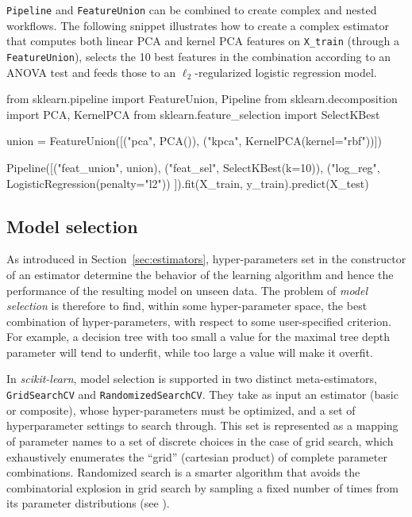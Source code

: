 \documentclass{llncs}
\newcommand{\sklearn}{\textit{scikit-learn}\xspace}
\begin{document}
\texttt{Pipeline} and \texttt{FeatureUnion} can be
combined to create complex and nested workflows.
The following snippet illustrates how to create a complex estimator
that computes both linear PCA and kernel PCA features on \texttt{X\_train}
(through a \texttt{FeatureUnion}),
selects the 10 best features in the combination according to an ANOVA test
and feeds those to an $\ell_2$-regularized logistic regression model.
\begin{pythoncode}
from sklearn.pipeline import FeatureUnion, Pipeline
from sklearn.decomposition import PCA, KernelPCA
from sklearn.feature_selection import SelectKBest

union = FeatureUnion([("pca", PCA()),
                      ("kpca", KernelPCA(kernel="rbf"))])

Pipeline([("feat_union", union),
          ("feat_sel", SelectKBest(k=10)),
          ("log_reg", LogisticRegression(penalty="l2"))
         ]).fit(X_train, y_train).predict(X_test)
\end{pythoncode}

\subsection{Model selection}

As introduced in Section~\ref{sec:estimators}, hyper-parameters set in the
constructor of an estimator
determine the behavior of the learning algorithm
and hence the performance of the resulting model on unseen data.
The problem of \textit{model selection} is therefore to find, within
some hyper-parameter space, the best combination of hyper-parameters, with
respect to some user-specified criterion. For example, a decision
tree with too small a value for the maximal tree depth
parameter will tend to underfit, while too large a value will make it overfit.

In \sklearn, model selection is supported in two distinct meta-estimators,
\texttt{GridSearchCV} and \texttt{RandomizedSearchCV}.  They take as input an
estimator (basic or composite), whose hyper-parameters must be optimized, and a
set of hyperparameter settings to search through.
This set is represented as a mapping of parameter names
to a set of discrete choices in the case of grid search,
which exhaustively enumerates the ``grid'' (cartesian product)
of complete parameter combinations.
Randomized search is a smarter algorithm
that avoids the combinatorial explosion in grid search
by sampling a fixed number of times from its parameter distributions
(see \citealp{bergstra2012}).
\end{document}
